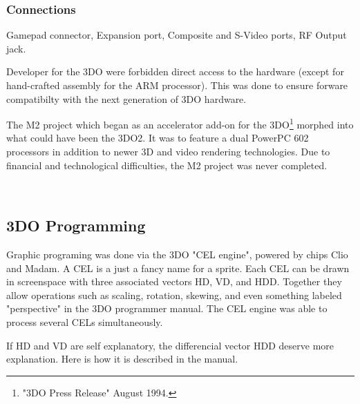 \subsubsection{Connections}
 Gamepad connector,
 Expansion port,
 Composite and S-Video ports, 
 RF Output jack. 


\par
Developer for the 3DO were forbidden direct access to the hardware (except for hand-crafted assembly for the ARM processor). This was done to ensure forware compatibilty with the next generation of 3DO hardware.\\
\par
 The M2 project which began as an accelerator add-on for the 3DO\footnote{"3DO Press Release" August 1994.} morphed into what could have been the 3DO2. It was to feature a dual PowerPC 602 processors in addition to newer 3D and video rendering technologies. Due to financial and technological difficulties, the M2 project was never completed.\\
\par
{}\\
\pagebreak

\subsection{3DO Programming}
Graphic programing was done via the 3DO "CEL engine", powered by chips Clio and Madam. A CEL is a just a fancy name for a sprite. Each CEL can be drawn in screenspace with three associated vectors HD, VD, and HDD. Together they allow operations such as scaling, rotation, skewing, and even something labeled "perspective" in the 3DO programmer manual. The CEL engine was able to process several CELs simultaneously.\\
\par
If HD and VD are self explanatory, the differencial vector HDD deserve more explanation. Here is how it is described in the manual.\\

